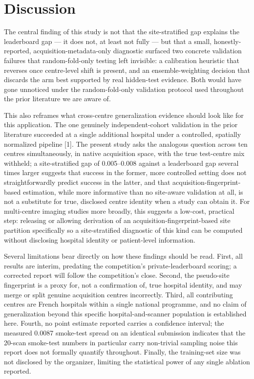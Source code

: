 \documentclass[11pt]{article}
\begin{document}
\section*{Discussion}

The central finding of this study is not that the site-stratified gap explains the leaderboard gap --- it does not, at least not fully --- but that a small, honestly-reported, acquisition-metadata-only diagnostic surfaced two concrete validation failures that random-fold-only testing left invisible: a calibration heuristic that reverses once centre-level shift is present, and an ensemble-weighting decision that discards the arm best supported by real hidden-test evidence. Both would have gone unnoticed under the random-fold-only validation protocol used throughout the prior literature we are aware of.

This also reframes what cross-centre generalization evidence should look like for this application. The one genuinely independent-cohort validation in the prior literature succeeded at a single additional hospital under a controlled, spatially normalized pipeline [1]. The present study asks the analogous question across ten centres simultaneously, in native acquisition space, with the true test-centre mix withheld; a site-stratified gap of 0.005--0.008 against a leaderboard gap several times larger suggests that success in the former, more controlled setting does not straightforwardly predict success in the latter, and that acquisition-fingerprint-based estimation, while more informative than no site-aware validation at all, is not a substitute for true, disclosed centre identity when a study can obtain it. For multi-centre imaging studies more broadly, this suggests a low-cost, practical step: releasing or allowing derivation of an acquisition-fingerprint-based site partition specifically so a site-stratified diagnostic of this kind can be computed without disclosing hospital identity or patient-level information.

Several limitations bear directly on how these findings should be read. First, all results are interim, predating the competition's private-leaderboard scoring; a corrected report will follow the competition's close. Second, the pseudo-site fingerprint is a proxy for, not a confirmation of, true hospital identity, and may merge or split genuine acquisition centres incorrectly. Third, all contributing centres are French hospitals within a single national programme, and no claim of generalization beyond this specific hospital-and-scanner population is established here. Fourth, no point estimate reported carries a confidence interval; the measured 0.0087 smoke-test spread on an identical submission indicates that the 20-scan smoke-test numbers in particular carry non-trivial sampling noise this report does not formally quantify throughout. Finally, the training-set size was not disclosed by the organizer, limiting the statistical power of any single ablation reported.
\end{document}
